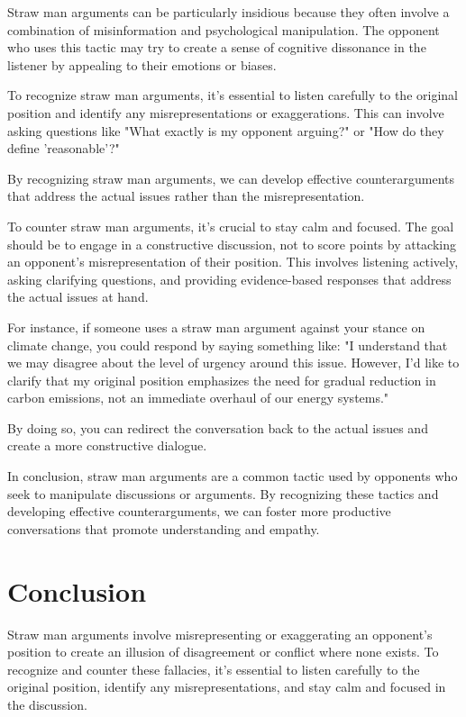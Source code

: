 \documentclass{report}%
\begin{document}
{{{Straw man arguments can be particularly insidious because they often involve a combination of misinformation and psychological manipulation. The opponent who uses this tactic may try to create a sense of cognitive dissonance in the listener by appealing to their emotions or biases.

To recognize straw man arguments, it's essential to listen carefully to the original position and identify any misrepresentations or exaggerations. This can involve asking questions like "What exactly is my opponent arguing?" or "How do they define 'reasonable'?"

By recognizing straw man arguments, we can develop effective counterarguments that address the actual issues rather than the misrepresentation.

To counter straw man arguments, it's crucial to stay calm and focused. The goal should be to engage in a constructive discussion, not to score points by attacking an opponent's misrepresentation of their position. This involves listening actively, asking clarifying questions, and providing evidence-based responses that address the actual issues at hand.

For instance, if someone uses a straw man argument against your stance on climate change, you could respond by saying something like: "I understand that we may disagree about the level of urgency around this issue. However, I'd like to clarify that my original position emphasizes the need for gradual reduction in carbon emissions, not an immediate overhaul of our energy systems."

By doing so, you can redirect the conversation back to the actual issues and create a more constructive dialogue.

In conclusion, straw man arguments are a common tactic used by opponents who seek to manipulate discussions or arguments. By recognizing these tactics and developing effective counterarguments, we can foster more productive conversations that promote understanding and empathy.

\section*{Conclusion}

Straw man arguments involve misrepresenting or exaggerating an opponent's position to create an illusion of disagreement or conflict where none exists. To recognize and counter these fallacies, it's essential to listen carefully to the original position, identify any misrepresentations, and stay calm and focused in the discussion.

}}}
\end{document}
